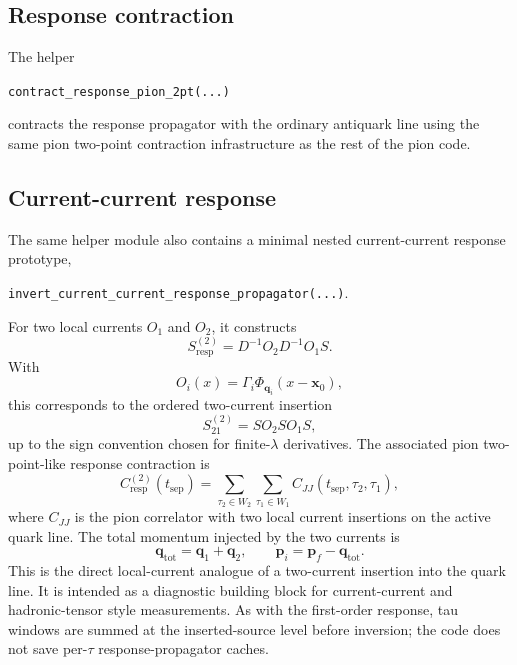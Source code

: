 \documentclass[11pt,a4paper]{article}
\newcommand{\Dslash}{D}
\newcommand{\Sresp}{S_{\mathrm{resp}}}
\newcommand{\Cresptwo}{C_{\mathrm{resp}}^{(2)}}
\begin{document}
\subsection{Response contraction}

The helper
\begin{center}
\texttt{contract\_response\_pion\_2pt(...)}
\end{center}
contracts the response propagator with the ordinary antiquark line using the
same pion two-point contraction infrastructure as the rest of the pion code.

\subsection{Current-current response}

The same helper module also contains a minimal nested current-current response
prototype,
\begin{center}
\texttt{invert\_current\_current\_response\_propagator(...)}.
\end{center}
For two local currents \(O_1\) and \(O_2\), it constructs
\begin{equation}
  \Sresp^{(2)}
  =
  \Dslash^{-1} O_2 \Dslash^{-1} O_1 S.
\end{equation}
With
\begin{equation}
  O_i(x)
  =
  \Gamma_i \Phi_{\mathbf q_i}(x-\mathbf x_0),
\end{equation}
this corresponds to the ordered two-current insertion
\begin{equation}
  S^{(2)}_{21}
  =
  S O_2 S O_1 S,
\end{equation}
up to the sign convention chosen for finite-\(\lambda\) derivatives.  The
associated pion two-point-like response contraction is
\begin{equation}
  \Cresptwo(t_{\mathrm{sep}})
  =
  \sum_{\tau_2\in W_2}
  \sum_{\tau_1\in W_1}
  C_{JJ}(t_{\mathrm{sep}},\tau_2,\tau_1),
\end{equation}
where \(C_{JJ}\) is the pion correlator with two local current insertions on
the active quark line.  The total momentum injected by the two currents is
\begin{equation}
  \mathbf q_{\mathrm{tot}} = \mathbf q_1 + \mathbf q_2,
  \qquad
  \mathbf p_i = \mathbf p_f - \mathbf q_{\mathrm{tot}}.
\end{equation}
This is the direct local-current analogue of a two-current insertion into the
quark line.  It is intended as a diagnostic building block for current-current
and hadronic-tensor style measurements.  As with the first-order response, tau
windows are summed at the inserted-source level before inversion; the code does
not save per-\(\tau\) response-propagator caches.
\end{document}

